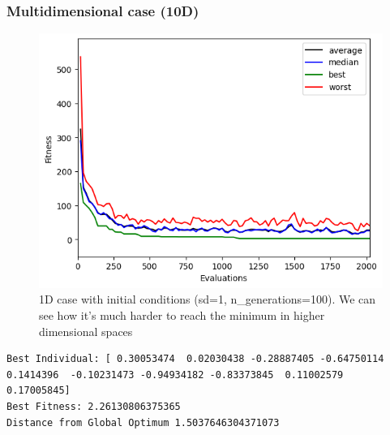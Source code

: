 \subsubsection{Multidimensional case (10D)}
\begin{figure}[H]
    \centering
    \includegraphics[width=\linewidth]{images/lab1/fitness_10D.png}
    \caption{1D case with initial conditions (sd=1, n\_generations=100). We can see how it's much harder to reach the minimum in higher dimensional spaces}
\end{figure}
\begin{lstlisting}
Best Individual: [ 0.30053474  0.02030438 -0.28887405 -0.64750114  0.1414396  -0.10231473 -0.94934182 -0.83373845  0.11002579  0.17005845]
Best Fitness: 2.26130806375365
Distance from Global Optimum 1.5037646304371073
\end{lstlisting}

